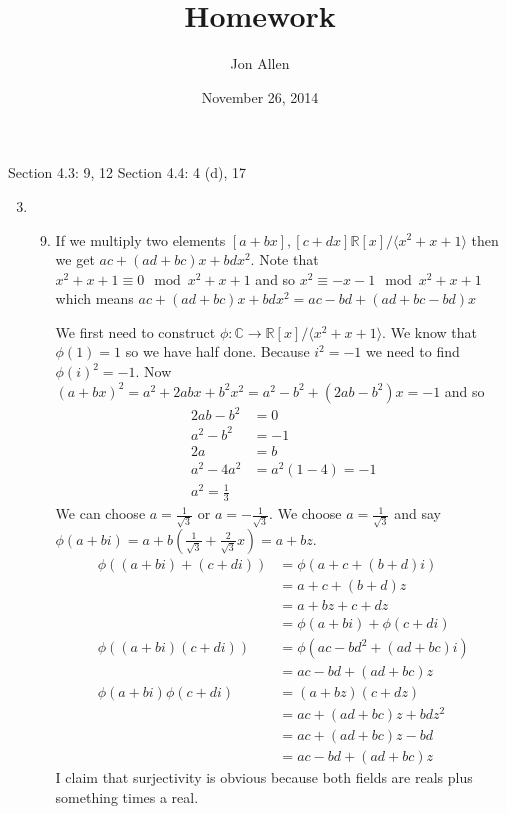 \documentclass[letterpaper]{article}
\begin{document}
\title{Homework}
\date{November 26, 2014}
\author{Jon Allen}
\maketitle
Section 4.3: 9, 12
Section 4.4: 4 (d), 17
\renewcommand{\labelenumi}{4.\arabic{enumi}}
\renewcommand{\labelenumii}{\arabic{enumii}.}
\renewcommand{\labelenumiii}{(\alph{enumiii})}
\begin{enumerate}
\setcounter{enumi}{2}
\item
  \begin{enumerate}
  \setcounter{enumii}{8}
  \item
  If we multiply two elements $[a+bx],[c+dx]\mathbb{R}[x]/\langle x^2+x+1\rangle$ then we get $ac+(ad+bc)x+bdx^2$. Note that $x^2+x+1\equiv0\mod x^2+x+1$ and so $x^2\equiv-x-1\mod x^2+x+1$ which means $ac+(ad+bc)x+bdx^2=ac-bd+(ad+bc-bd)x$

  We first need to construct $\phi:\mathbb{C}\to \mathbb{R}[x]/\langle x^2+x+1\rangle$.
  We know that $\phi(1)=1$  so we have half done.
  Because $i^2=-1$ we need to find $\phi(i)^2=-1$. Now $(a+bx)^2=a^2+2abx+b^2x^2=a^2-b^2+(2ab-b^2)x=-1$ and so
  \begin{align*}
    2ab-b^2&=0\\
    a^2-b^2&=-1\\
    2a&=b\\
    a^2-4a^2&=a^2(1-4)=-1\\
    a^2=\frac{1}{3}
  \end{align*}
  We can choose $a=\frac{1}{\sqrt{3}}$ or $a=-\frac{1}{\sqrt{3}}$. We choose $a=\frac{1}{\sqrt{3}}$ and say $\phi(a+bi)=a+b(\frac{1}{\sqrt{3}}+\frac{2}{\sqrt{3}}x)=a+bz$.
  \begin{align*}
    \phi((a+bi)+(c+di))&=\phi(a+c+(b+d)i)\\
    &=a+c+(b+d)z\\
    &=a+bz+c+dz\\
    &=\phi(a+bi)+\phi(c+di)\\
    \phi((a+bi)(c+di))&=\phi(ac-bd^2+(ad+bc)i)\\
    &=ac-bd+(ad+bc)z\\
    \phi(a+bi)\phi(c+di)&=(a+bz)(c+dz)\\
    &=ac+(ad+bc)z+bdz^2\\
    &=ac+(ad+bc)z-bd\\
    &=ac-bd+(ad+bc)z
  \end{align*}
  I claim that surjectivity is obvious because both fields are reals plus something times a real. 


\end{enumerate}
\end{enumerate}
\end{document}
